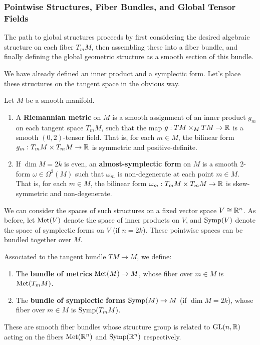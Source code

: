 \subsubsection{Pointwise Structures, Fiber Bundles, and Global Tensor Fields}

The path to global structures proceeds by first considering the desired algebraic structure on each fiber $T_m M$, then assembling these into a fiber bundle, and finally defining the global geometric structure as a smooth section of this bundle.

We have already defined an inner product and a symplectic form. Let's place these structures on the tangent space in the obvious way.

\begin{definition}
Let $M$ be a smooth manifold.
\begin{enumerate}
    \item A \textbf{Riemannian metric} on $M$ is a smooth assignment of an inner product $g_m$ on each tangent space $T_m M$, such that the map $g: TM \times_M TM \to \mathbb{R}$ is a smooth $(0,2)$-tensor field. That is, for each $m \in M$, the bilinear form $g_m: T_m M \times T_m M \to \mathbb{R}$ is symmetric and positive-definite.
    
    \item If $\dim M = 2k$ is even, an \textbf{almost-symplectic form} on $M$ is a smooth 2-form $\omega \in \Omega^2(M)$ such that $\omega_m$ is non-degenerate at each point $m \in M$. That is, for each $m \in M$, the bilinear form $\omega_m: T_m M \times T_m M \to \mathbb{R}$ is skew-symmetric and non-degenerate.
\end{enumerate}
\end{definition}

We can consider the spaces of such structures on a fixed vector space $V \cong \mathbb{R}^n$. As before, let $\operatorname{Met}(V)$ denote the space of inner products on $V$, and $\operatorname{Symp}(V)$ denote the space of symplectic forms on $V$ (if $n=2k$). These pointwise spaces can be bundled together over $M$.

\begin{definition}
Associated to the tangent bundle $TM \to M$, we define:
\begin{enumerate}
    \item The \textbf{bundle of metrics} $\operatorname{Met}(M) \to M$, whose fiber over $m \in M$ is $\operatorname{Met}(T_m M)$.
    \item The \textbf{bundle of symplectic forms} $\operatorname{Symp}(M) \to M$ (if $\dim M = 2k$), whose fiber over $m \in M$ is $\operatorname{Symp}(T_m M)$.
\end{enumerate}
These are smooth fiber bundles whose structure group is related to $\mathrm{GL}(n, \mathbb{R})$ acting on the fibers $\operatorname{Met}(\mathbb{R}^n)$ and $\operatorname{Symp}(\mathbb{R}^n)$ respectively.
\end{definition}

